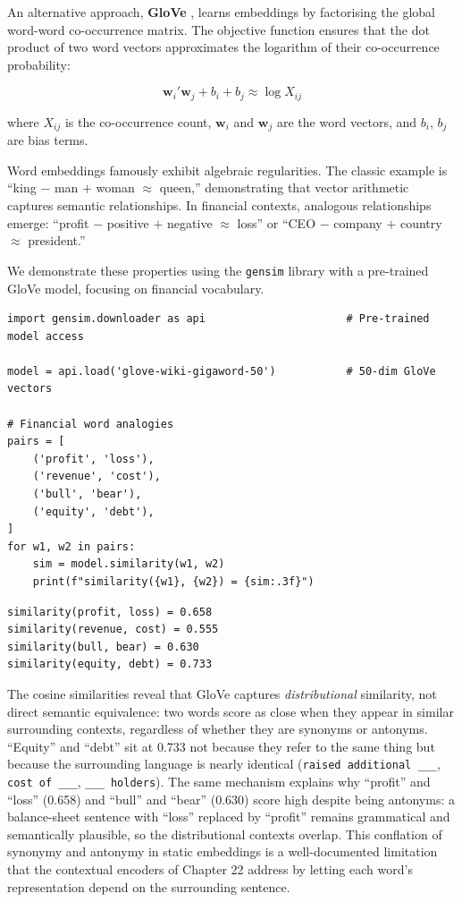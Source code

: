 An alternative approach, \textbf{GloVe} \citep{pennington2014glove}, learns embeddings by factorising the global word-word co-occurrence matrix. The objective function ensures that the dot product of two word vectors approximates the logarithm of their co-occurrence probability:

\begin{equation}
\mathbf{w}_i' \mathbf{w}_j + b_i + b_j \approx \log X_{ij}
\tag{21.2}
\end{equation}

where $X_{ij}$ is the co-occurrence count, $\mathbf{w}_i$ and $\mathbf{w}_j$ are the word vectors, and $b_i$, $b_j$ are bias terms.

Word embeddings famously exhibit algebraic regularities. The classic example is ``king $-$ man $+$ woman $\approx$ queen,'' demonstrating that vector arithmetic captures semantic relationships. In financial contexts, analogous relationships emerge: ``profit $-$ positive $+$ negative $\approx$ loss'' or ``CEO $-$ company $+$ country $\approx$ president.''

We demonstrate these properties using the \texttt{gensim} library with a pre-trained GloVe model, focusing on financial vocabulary.

\begin{verbatim}
import gensim.downloader as api                      # Pre-trained model access

model = api.load('glove-wiki-gigaword-50')           # 50-dim GloVe vectors

# Financial word analogies
pairs = [
    ('profit', 'loss'),
    ('revenue', 'cost'),
    ('bull', 'bear'),
    ('equity', 'debt'),
]
for w1, w2 in pairs:
    sim = model.similarity(w1, w2)
    print(f"similarity({w1}, {w2}) = {sim:.3f}")
\end{verbatim}

\begin{verbatim}
similarity(profit, loss) = 0.658
similarity(revenue, cost) = 0.555
similarity(bull, bear) = 0.630
similarity(equity, debt) = 0.733
\end{verbatim}

The cosine similarities reveal that GloVe captures \textit{distributional} similarity, not direct semantic equivalence: two words score as close when they appear in similar surrounding contexts, regardless of whether they are synonyms or antonyms. ``Equity'' and ``debt'' sit at 0.733 not because they refer to the same thing but because the surrounding language is nearly identical (\texttt{raised additional \_\_\_}, \texttt{cost of \_\_\_}, \texttt{\_\_\_ holders}). The same mechanism explains why ``profit'' and ``loss'' (0.658) and ``bull'' and ``bear'' (0.630) score high despite being antonyms: a balance-sheet sentence with ``loss'' replaced by ``profit'' remains grammatical and semantically plausible, so the distributional contexts overlap. This conflation of synonymy and antonymy in static embeddings is a well-documented limitation that the contextual encoders of Chapter 22 address by letting each word's representation depend on the surrounding sentence.

